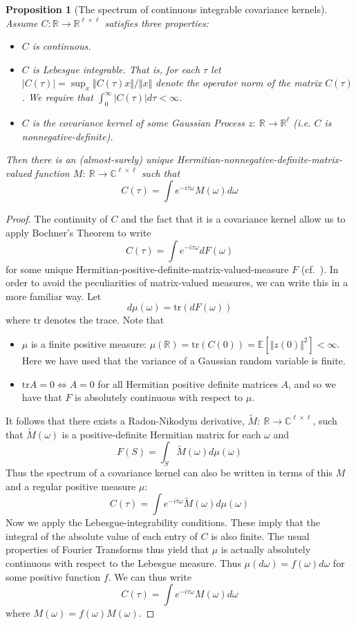 \documentclass{article}
\newtheorem{prop}{Proposition}
\theoremstyle{definition}
\newcommand{\tr}{\mathrm{tr}}
\begin{document}
\begin{prop}[The spectrum of continuous integrable covariance kernels] \label{prop:generalspectra}
Assume $C: \mathbb{R} \rightarrow \mathbb{R}^{\ell \times\ell}$ satisfies three properties:
\begin{itemize}
    \item $C$ is continuous.
    \item $C$ is Lebesgue integrable.  That is, for each $\tau$ let $|C(\tau)|=\sup_x \Vert C(\tau)x \Vert / \Vert x \Vert$ denote the operator norm of the matrix $C(\tau)$.  We require that $\int_0^\infty |C(\tau)| d\tau < \infty$.
    \item $C$ is the covariance kernel of some Gaussian Process $z:\ \mathbb{R}\rightarrow \mathbb{R}^\ell$ (i.e. $C$ is nonnegative-definite).
\end{itemize}
Then there is an (almost-surely) unique Hermitian-nonnegative-definite-matrix-valued function $M:\ \mathbb{R}\rightarrow \mathbb{C}^{\ell \times \ell}$ such that
\[
C(\tau) = \int e^{-i \tau \omega} M(\omega) d\omega 
\]
\end{prop}
\begin{proof}
The continuity of $C$ and the fact that it is a covariance kernel allow us to apply Bochner's Theorem to write
\[
C(\tau) = \int e^{-i \tau \omega} dF(\omega)
\]
for some unique Hermitian-positive-definite-matrix-valued-measure $F$ (cf.\ \cite{brockwell2013time}).  In order to avoid the peculiarities of matrix-valued measures, we can write this in a more familiar way.  Let
\[
d\mu(\omega) = \tr\left( dF(\omega)\right)
\]
where $\tr$ denotes the trace.  Note that
\begin{itemize}
    \item $\mu$ is a finite positive measure: $\mu(\mathbb{R}) = \tr\left(C(0)\right) = \mathbb{E}[\Vert z(0) \Vert^2]< \infty$.  Here we have used that the variance of a Gaussian random variable is finite.  
    \item $\tr A=0 \Leftrightarrow A=0$ for all Hermitian positive definite matrices $A$, and so we have that $F$ is absolutely continuous with respect to $\mu$.
\end{itemize}
It follows that there exists a Radon-Nikodym derivative, $\tilde M:\ \mathbb{R} \rightarrow \mathbb{C}^{\ell \times \ell}$, such that $\tilde M(\omega)$ is a positive-definite Hermitian matrix for each $\omega$ and
\[
F(S) = \int_S \tilde M(\omega) d\mu(\omega)
\]
Thus the spectrum of a covariance kernel can also be written in terms of this $M$ and a regular positive measure $\mu$:
\[
C(\tau) = \int e^{-i \tau \omega} \tilde M(\omega) d\mu(\omega)
\]
Now we apply the Lebesgue-integrability conditions.  These imply that the integral of the absolute value of each entry of $C$ is also finite.  The usual properties of Fourier Transforms thus yield that $\mu$ is actually absolutely continuous with respect to the Lebesgue measure.  Thus $\mu(d\omega) = f(\omega)d\omega$ for some positive function $f$.  We can thus write
\[
C(\tau) = \int e^{-i \tau \omega} M(\omega) d\omega
\]
where $M(\omega) = f(\omega)M(\omega)$.  
\end{proof}
\end{document}
